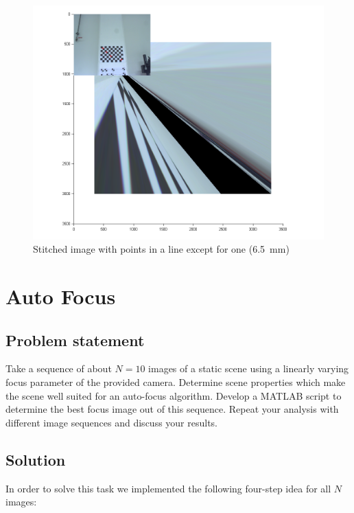 \documentclass[
a4paper,     %
11pt         %
]{scrartcl}  %
\begin{document}
\begin{figure}[ht!]
 \centering
 \includegraphics[scale=0.4]{./Bildg_Messtechnik_Lab/PanoramaStitching/figb5.png}
 \caption{Stitched image with points in a line except for one (\SI{6.5}{mm})}
 \label{fig:lineareastitch}
\end{figure}

\pagebreak

\section{Auto Focus}

\subsection{Problem statement}

Take a sequence of about $N = 10$ images of a static scene using a linearly varying focus parameter of the
provided camera. Determine scene properties which make the scene well suited for an auto-focus algorithm.
Develop a MATLAB script to determine the best focus image out of this sequence. Repeat your analysis with
different image sequences and discuss your results.

\subsection{Solution}

In order to solve this task we implemented the following four-step idea for all $N$ images:
\end{document}
